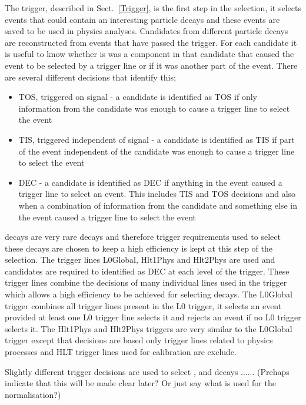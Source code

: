 The trigger, described in Sect.~\ref{Trigger}, is the first step in the selection, it selects events that could contain an interesting particle decays and these events are saved to be used in physics analyses. Candidates from different particle decays are reconstructed from events that have passed the trigger. For each candidate it is useful to know whether is was a component in that candidate that caused the event to be selected by a trigger line or if it was another part of the event. There are several different decisions that identify this;
\begin{itemize}
\item TOS, triggered on signal - a candidate is identified as TOS if only information from the candidate was enough to cause a trigger line to select the event
\item TIS, triggered independent of signal - a candidate is identified as TIS if part of the event independent of the candidate was enough to cause a trigger line to select the event
\item DEC - a candidate is identified as DEC if anything in the event caused a trigger line to select an event. This includes TIS and TOS decisions and also when a combination of information from the candidate and something else in the event caused a trigger line to select the event
\end{itemize}

\bsmumu decays are very rare decays and therefore trigger requirements used to select these decays are chosen to keep a high efficiency is kept at this step of the selection. The trigger lines L0Global, Hlt1Phys and Hlt2Phys are used and candidates are required to identified as DEC at each level of the trigger. These trigger lines combine the decisions of many individual lines used in the trigger which allows a high efficiency to be achieved for selecting \bsmumu decays. The L0Global trigger combines all trigger lines present in the L0 trigger, it selects an event provided at least one L0 trigger line selects it and rejects an event if no L0 trigger selects it. The Hlt1Phys and Hlt2Phys triggers are very similar to the L0Global trigger except that decisions are based only trigger lines related to physics processes and HLT trigger lines used for calibration are exclude.


Slightly different trigger decisions are used to select \bhh, \bujpsik and \bsjpisphi decays ...... (Prehaps indicate that this will be made clear later? Or just say what is used for the normalisation?) %

